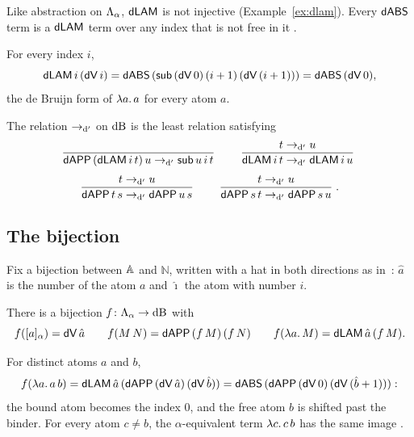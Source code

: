 Like abstraction on $\Lambda_{\alpha}$, $\mathsf{dLAM}$ is not injective
(Example~\ref{ex:dlam}). Every $\mathsf{dABS}$
term is a $\mathsf{dLAM}$ term over any index that is not free in it
\cite[Lemma~6]{norrish2007a}.

\begin{example}
\label{ex:dlam}
For every index $i$,
\[
  \mathsf{dLAM}\, i\, (\mathsf{dV}\, i)
  = \mathsf{dABS}\, (\mathsf{sub}\, (\mathsf{dV}\, 0)\, (i + 1)\, (\mathsf{dV}\, (i + 1)))
  = \mathsf{dABS}\, (\mathsf{dV}\, 0),
\]
the de Bruijn form of $\lambda a.\,a$ for every atom $a$.
\end{example}

\begin{definition}
\label{def:dbeta-prime}
The relation $\to_{\mathrm{d}'}$ on $\mathrm{dB}$ is the least relation satisfying
\begin{gather*}
  \dfrac{}{\mathsf{dAPP}\, (\mathsf{dLAM}\, i\, t)\, u \to_{\mathrm{d}'} \mathsf{sub}\, u\, i\, t}\;\textsc{}
  \qquad
  \dfrac{t \to_{\mathrm{d}'} u}{\mathsf{dLAM}\, i\, t \to_{\mathrm{d}'} \mathsf{dLAM}\, i\, u}\;\textsc{}
  \\[1ex]
  \dfrac{t \to_{\mathrm{d}'} u}{\mathsf{dAPP}\, t\, s \to_{\mathrm{d}'} \mathsf{dAPP}\, u\, s}\;\textsc{}
  \qquad
  \dfrac{t \to_{\mathrm{d}'} u}{\mathsf{dAPP}\, s\, t \to_{\mathrm{d}'} \mathsf{dAPP}\, s\, u}\;\textsc{}.
\end{gather*}
\end{definition}

\subsection{The bijection}
\label{subsec:bijection}

Fix a bijection between $\mathbb{A}$ and $\mathbb{N}$, written with a hat
in both directions as in~\cite{norrish2007a}: $\hat{a}$ is the number
of the atom $a$ and $\hat{\imath}$ the atom with number $i$.

\begin{theorem}
\label{thm:db-bijection}
There is a bijection $f \colon \Lambda_{\alpha} \to \mathrm{dB}$ with
\begin{equation}
\label{eq:f}
  f([a]_{\alpha}) = \mathsf{dV}\, \hat{a}
  \qquad
  f(M\, N) = \mathsf{dAPP}\, (f\, M)\, (f\, N)
  \qquad
  f(\lambda a.\,M) = \mathsf{dLAM}\, \hat{a}\, (f\, M).
\end{equation}
\end{theorem}

\begin{example}
\label{ex:f}
For distinct atoms $a$ and $b$,
\[
  f(\lambda a.\,a\,b)
  = \mathsf{dLAM}\, \hat{a}\, (\mathsf{dAPP}\, (\mathsf{dV}\, \hat{a})\, (\mathsf{dV}\, \hat{b}))
  = \mathsf{dABS}\, (\mathsf{dAPP}\, (\mathsf{dV}\, 0)\, (\mathsf{dV}\, (\hat{b} + 1))):
\]
the bound atom becomes the index $0$, and the free atom $b$ is
shifted past the binder. For every atom $c \neq b$, the
$\alpha$-equivalent term $\lambda c.\,c\,b$ has the same image
.
\end{example}

